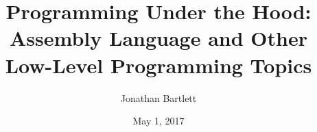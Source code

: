 \documentclass[12pt]{book}
\newcommand{\forebook}[1]{#1}
\newcommand{\forprintbook}[1]{}
\newcommand{\forebook}[1]{}
\newcommand{\forprintbook}[1]{#1}
\begin{document}
\title{Programming Under the Hood: Assembly Language and Other Low-Level Programming Topics}
\author{Jonathan Bartlett}
\date{May 1, 2017}

\sloppy

\forprintbook{
\frontmatter

\tableofcontents
\newpage
\mainmatter
}

\forebook{
\mainmatter
\tableofcontents

}

















\appendix










\cleardoublepage
{}

\raggedright
\printindex
\end{document}

